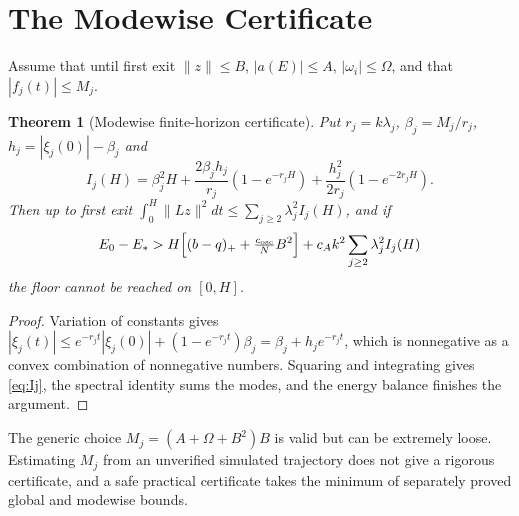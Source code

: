 \documentclass[11pt,notitlepage]{report}
\newtheorem{theorem}{Theorem}[chapter]
\theoremstyle{definition}
\theoremstyle{remark}
\begin{document}
\section{The Modewise Certificate}
Assume that until first exit $\|z\|\le B$, $|a(E)|\le A$, $|\omega_i|\le\Omega$, and that $|f_j(t)|\le M_j$.
\begin{theorem}[Modewise finite-horizon certificate]\label{th:modewise}
Put $r_j=k\lambda_j$, $\beta_j=M_j/r_j$, $h_j=|\xi_j(0)|-\beta_j$ and
\begin{equation}\label{eq:Ij}
I_j(H)=\beta_j^2H+\frac{2\beta_jh_j}{r_j}(1-e^{-r_jH})+\frac{h_j^2}{2r_j}(1-e^{-2r_jH}).
\end{equation}
Then up to first exit $\int_0^H\|Lz\|^2dt\le\sum_{j\ge2}\lambda_j^2I_j(H)$, and if
\[
E_0-E_*>H\Bigl[(b-q)_++\tfrac{c_{\rm osc}}NB^2\Bigr]+c_Ak^2\sum_{j\ge2}\lambda_j^2I_j(H)
\]
the floor cannot be reached on $[0,H]$.
\end{theorem}
\begin{proof}
Variation of constants gives $|\xi_j(t)|\le e^{-r_jt}|\xi_j(0)|+(1-e^{-r_jt})\beta_j=\beta_j+h_je^{-r_jt}$, which is nonnegative as a convex combination of nonnegative numbers. Squaring and integrating gives \eqref{eq:Ij}, the spectral identity sums the modes, and the energy balance finishes the argument.
\end{proof}
The generic choice $M_j=(A+\Omega+B^2)B$ is valid but can be extremely loose. Estimating $M_j$ from an unverified simulated trajectory does not give a rigorous certificate, and a safe practical certificate takes the minimum of separately proved global and modewise bounds.
\end{document}
